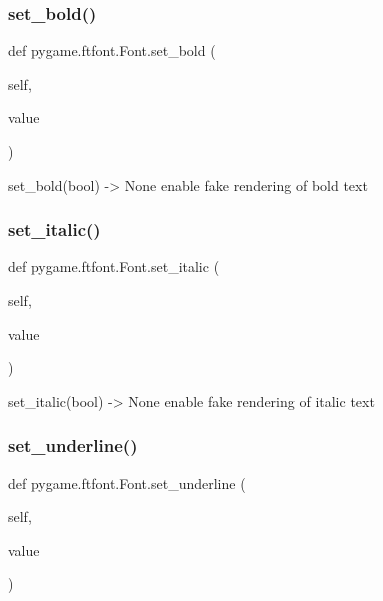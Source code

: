 \subsubsection{\texorpdfstring{set\+\_\+bold()}{set\_bold()}}
{\footnotesize\ttfamily def pygame.\+ftfont.\+Font.\+set\+\_\+bold (\begin{DoxyParamCaption}\item[{}]{self,  }\item[{}]{value }\end{DoxyParamCaption})}

\begin{DoxyVerb}set_bold(bool) -> None
   enable fake rendering of bold text\end{DoxyVerb}
 \mbox{\label{classpygame_1_1ftfont_1_1_font_a95da231e409217b7ab1b4944cf769489}} 
\subsubsection{\texorpdfstring{set\+\_\+italic()}{set\_italic()}}
{\footnotesize\ttfamily def pygame.\+ftfont.\+Font.\+set\+\_\+italic (\begin{DoxyParamCaption}\item[{}]{self,  }\item[{}]{value }\end{DoxyParamCaption})}

\begin{DoxyVerb}set_italic(bool) -> None
   enable fake rendering of italic text\end{DoxyVerb}
 \mbox{\label{classpygame_1_1ftfont_1_1_font_af4a7a2d347bde46fa1f9fc73905a7497}} 
\subsubsection{\texorpdfstring{set\+\_\+underline()}{set\_underline()}}
{\footnotesize\ttfamily def pygame.\+ftfont.\+Font.\+set\+\_\+underline (\begin{DoxyParamCaption}\item[{}]{self,  }\item[{}]{value }\end{DoxyParamCaption})}

